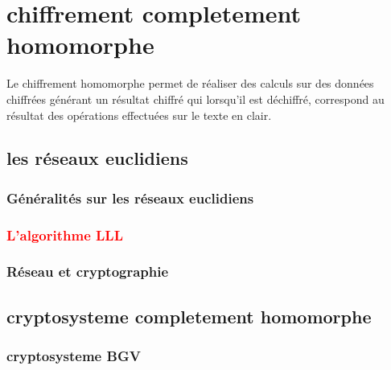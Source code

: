 \documentclass[a4paper,11pt]{report}
\begin{document}
\section{chiffrement completement homomorphe}
Le chiffrement homomorphe permet de réaliser des calculs sur des données chiffrées générant un résultat chiffré qui lorsqu'il est déchiffré, correspond au résultat des opérations effectuées sur le texte en clair. 
\subsection*{les réseaux euclidiens}
\subsubsection*{Généralités sur les réseaux euclidiens}
\subsubsection*{\textcolor{red}{L'algorithme LLL}}
\subsubsection*{Réseau et cryptographie}
\subsection*{cryptosysteme completement homomorphe}
\subsubsection*{cryptosysteme BGV}
\end{document}
